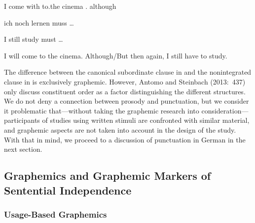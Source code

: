 I  come    with  to.the  cinema  .  although



ich  noch  lernen  muss  …



I  still  study    must  …



I will come to the cinema. Although/But then again, I still have to study.



The difference between the canonical subordinate clause in  and the nonintegrated clause in  is exclusively graphemic. However, Antomo and Steinbach (2013:~437) only discuss constituent order as a factor distinguishing the dif\-ferent structures. We do not deny a connection between prosody and punctuation, but we consider it problematic that—without taking the graphemic research into consideration—participants of studies using written stimuli are confronted with similar material, and graphemic aspects are not taken into account in the design of the study. With that in mind, we proceed to a discussion of punctuation in German in the next section.



\subsection{Graphemics and Graphemic Markers of Sentential Independence}



\subsubsection{Usage-Based Graphemics}



